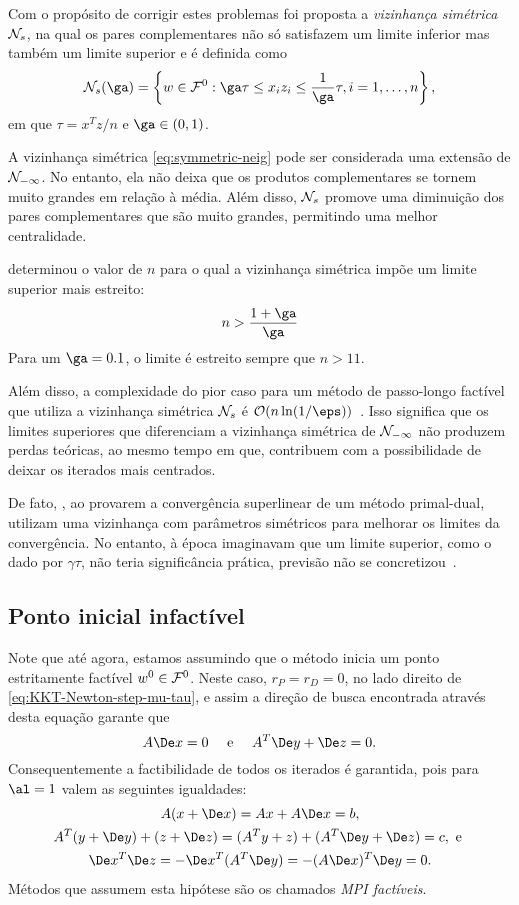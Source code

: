 Com o propósito de corrigir estes problemas foi proposta a \emph{vizinhança
simétrica} $\mathcal{N}_s$, na qual os pares complementares não só satisfazem um limite inferior
mas também um limite superior e é definida como
\begin{equation}
\label{eq:symmetric-neig}
\Nset_s(\ga) = \left\{w\in\Fset^0 : \ga\tau \leq x_iz_i \leq
\frac{1}{\ga}\tau, i=1,\dotsc,n \right\},
\end{equation}
em que $\tau = x^Tz/n$ e $\ga\in(0,1)$.

A vizinhança simétrica \eqref{eq:symmetric-neig}  pode ser considerada uma
extensão de $\mathcal{N}_{-\infty}$. No entanto, ela não deixa que os
produtos complementares se tornem muito grandes em relação à média. Além disso, $\mathcal{N}_s$ promove uma diminuição dos
pares complementares que são muito grandes, permitindo uma melhor centralidade. 


\textcite{Colombo:2008wm}
determinou o valor de $n$ para o qual a vizinhança simétrica impõe um limite
superior mais estreito:
\[
n> \frac{1+\ga}{\ga}
\]
Para um $\ga=0.1$, o limite é estreito sempre que $n>11$. 

Além disso, a complexidade do pior caso  para um método de passo-longo factível
que utiliza a vizinhança simétrica $\mathcal{N}_s$ é $\Oset(n\ln(1/\eps))$~\cite{Colombo:2008ia}.
Isso significa que  os limites superiores que diferenciam a vizinhança simétrica
de $\mathcal{N}_{-\infty}$ não produzem perdas teóricas, ao mesmo tempo em que,
contribuem com  a possibilidade de deixar os iterados mais centrados.
  
  
De fato, \textcite{Zhang:1993gn}, ao provarem a convergência superlinear de um método
primal-dual, utilizam uma vizinhança com parâmetros simétricos para melhorar os
limites da convergência. No entanto, à época imaginavam que um limite superior,
como o dado por $\gamma\tau$,  não teria significância prática, previsão não se
concretizou~\cite{Gondzio:1996uw,Colombo:2008wm,Colombo:2008ia}.

\subsection{Ponto inicial infactível}
\label{sec:infeasible_inicial_point}

Note que até agora, estamos assumindo que o método inicia  um ponto estritamente
factível $w^0 \in \mathcal{F}^0$. Neste caso, $r_P = r_D = 0$, no lado
direito de \eqref{eq:KKT-Newton-step-mu-tau}, e assim a direção de busca
encontrada através desta equação garante que
\begin{equation}
\label{eq:fact-direction}
A\Dex = 0 \quad \text{ e } \quad A^T\Dey + \Dez = 0.
\end{equation}
Consequentemente a factibilidade de todos os iterados é garantida, pois para
$\al =1$ valem as seguintes igualdades:
\begin{gather*}
A(x + \Dex) = Ax + A\Dex = b, \\
A^T(y+\Dey) + (z + \Dez) = (A^Ty + z) + (A^T\Dey + \Dez) = c, \text{ e }\\
\Dex^T \Dez  = - \Dex^T (A^T\Dey) = - (A\Dex)^T\Dey = 0.
\end{gather*}
Métodos que assumem esta hipótese são os chamados \emph{\ac{MPI} factíveis}. 

